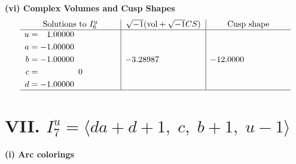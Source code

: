 \documentclass[1p]{elsarticle_modified}
\theoremstyle{definition}
\newcommand{\I}{\sqrt{-1}}
\begin{document}
\newpage\flushleft \textbf{(vi) Complex Volumes and Cusp Shapes}
$$\begin{array}{c|c|c}  
\text{Solutions to }I^u_{6}& \I (\text{vol} + \sqrt{-1}CS) & \text{Cusp shape}\\
 \hline 
\begin{aligned}
u &= \phantom{-}1.00000\phantom{ +0.000000I} \\
a &= -1.00000\phantom{ +0.000000I} \\
b &= -1.00000\phantom{ +0.000000I} \\
c &= \phantom{-0.000000 } 0 \\
d &= -1.00000\phantom{ +0.000000I}\end{aligned}
 & -3.28987\phantom{ +0.000000I} & -12.0000\phantom{ +0.000000I}\\
 \hline 
 \end{array}$$\newpage\newpage\renewcommand{\arraystretch}{1}
\centering \section*{VII. $I^u_{7}= \langle d a+d+1,\;c,\;b+1,\;u-1 \rangle$}
\flushleft \textbf{(i) Arc colorings}\\
\end{document}
